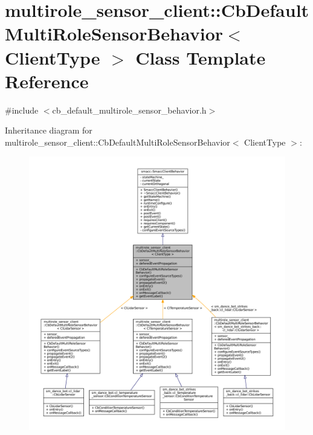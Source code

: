\hypertarget{classmultirole__sensor__client_1_1CbDefaultMultiRoleSensorBehavior}{}\section{multirole\+\_\+sensor\+\_\+client\+:\+:Cb\+Default\+Multi\+Role\+Sensor\+Behavior$<$ Client\+Type $>$ Class Template Reference}
\label{classmultirole__sensor__client_1_1CbDefaultMultiRoleSensorBehavior}


{\ttfamily \#include $<$cb\+\_\+default\+\_\+multirole\+\_\+sensor\+\_\+behavior.\+h$>$}



Inheritance diagram for multirole\+\_\+sensor\+\_\+client\+:\+:Cb\+Default\+Multi\+Role\+Sensor\+Behavior$<$ Client\+Type $>$\+:
\nopagebreak
\begin{figure}[H]
\begin{center}
\leavevmode
\includegraphics[width=350pt]{classmultirole__sensor__client_1_1CbDefaultMultiRoleSensorBehavior__inherit__graph}
\end{center}
\end{figure}


